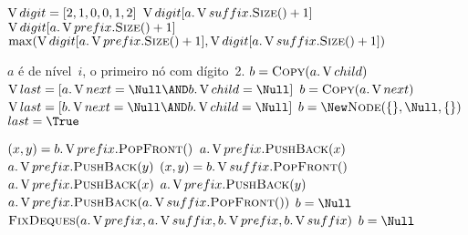 \documentclass[main.tex]{subfiles}
\begin{document}
\begin{algorithm}
\begin{algorithmic}[1]

    \State $\operatorname{V}{digit} = [2, 1, 0, 0, 1, 2]$ 
        \State \Return $\V{digit}[a.\V{suffix}.\Call{Size}{\null} + 1]$
        \State \Return $\V{digit}[a.\V{prefix}.\Call{Size}{\null} + 1]$
    \Else
        \State \Return $\max(\V{digit}[a.\V{prefix}.\Call{Size}{\null} + 1], \V{digit}[a.\V{suffix}.\Call{Size}{\null} + 1])$
    \EndIf
\EndFunction

\Require $a$ é de nível~$i$, o primeiro nó com dígito~2.
     \label{line:fix:p1b}
        \State $b = \Call{Copy}{a.\V{child}}$
        \State $\V{last} = [a.\V{next} = \Null \AND b.\V{child} = \Null]$
        \State $b = \Call{Copy}{a.\V{next}}$
        \State $\V{last} = [b.\V{next} = \Null \AND b.\V{child} = \Null]$
    \Else
        \State $b = \New \Call{Node}{\{\}, \Null, \{\}}$
        \State $last = \True$ \label{line:fix:p1e}
    \EndIf

       \label{line:fix:p2b}
            \State $(x, y) = b.\V{prefix}.\Call{PopFront}{\null}$
            \State $a.\operatorname{V}{prefix}.\textsc{PushBack}(x)$
            \State $a.\operatorname{V}{prefix}.\textsc{PushBack}(y)$
        \EndIf
            \State $(x, y) = b.\V{suffix}.\Call{PopFront}{\null}$
            \State $a.\operatorname{V}{prefix}.\textsc{PushBack}(x)$
            \State $a.\operatorname{V}{prefix}.\textsc{PushBack}(y)$
        \EndIf
            \State $a.\V{prefix}.\textsc{PushBack}(a.\V{suffix}.\Call{PopFront}{\null})$
        \EndIf
        \State $b = \Null$  \label{line:fix:p2e}
    \Else {}  \label{line:fix:p3b}
        \State $\Call{FixDeques}{a.\V{prefix}, a.\V{suffix}, b.\V{prefix}, b.\V{suffix}}$
         \label{line:fix:if_empty}
            \State $b = \Null$  \label{line:fix:p3e}
        \EndIf
    \EndIf


\end{algorithmic}
\end{algorithm}
\end{document}
